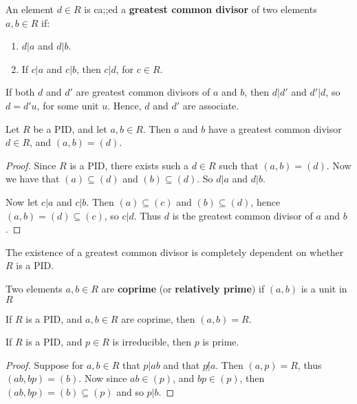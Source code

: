 \begin{definition}
    An element $d \in R$ is ca;;ed a \textbf{greatest common divisor} of two elements $a,b \in R$ if:
        \begin{enumerate}[label=(\arabic*)]
            \item $d|a$ and $d|b$.
            
            \item If $c|a$ and $c|b$, then $c|d$, for $c \in R$.
        \end{enumerate}
\end{definition}

If both $d$ and $d'$ are greatest common divisors of $a$ and $b$, then $d|d'$ and $d'|d$, so $d=d'u$, for some unit $u$. Hence, $d$ and $d'$ are associate.

\begin{proposition}\label{proposition1.3.2}
    Let $R$ be a PID, and let $a,b \in R$. Then $a$ and $b$ have a greatest common divisor $d \in R$, and $(a,b)=(d)$.
\end{proposition}
\begin{proof}
    Since $R$ is a PID, there exists such a $d \in R$ such that $(a,b)=(d)$. Now we have that $(a) \subseteq (d)$ and $(b) \subseteq (d)$. So $d|a$ and $d|b$.
    
    Now let $c|a$ and $c|b$. Then $(a) \subseteq (c)$ and $(b) \subseteq (d)$, hence $(a,b)=(d) \subseteq (c)$, so $c|d$. Thus $d$ is the greatest common divisor of $a$ and $b$.
\end{proof}

The existence of a greatest common divisor is completely dependent on whether $R$ is a PID.

\begin{definition}
    Two elements $a,b \in R$ are \textbf{coprime} (or \textbf{relatively prime}) if $(a,b)$ is a unit in $R$
\end{definition}

\begin{corollary}
    If $R$ is a PID, and $a,b \in R$ are coprime, then $(a,b)=R$. 
\end{corollary}

\begin{corollary}
    If $R$ is a PID, and $p \in R$ is irreducible, then $p$ is prime.
\end{corollary}
\begin{proof}
    Suppose for $a,b \in R$ that $p|ab$ and that $p \not| a$. Then $(a,p)=R$, thus $(ab,bp)=(b)$. Now since $ab \in (p)$, and $bp \in (p)$, then $(ab,bp)=(b) \subseteq (p)$ and so $p|b$.
\end{proof}

